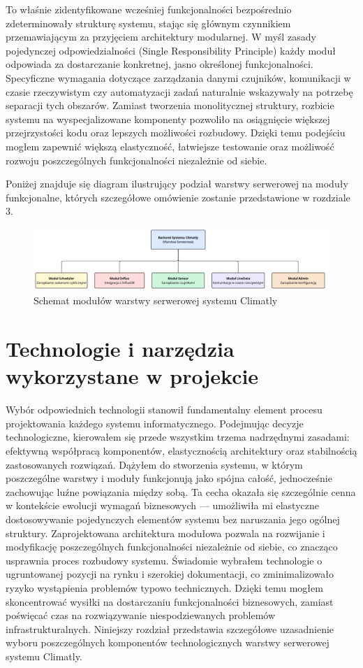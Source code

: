 \documentclass[a4paper,12pt,openany]{book}
\begin{document}
To właśnie zidentyfikowane wcześniej funkcjonalności bezpośrednio zdeterminowały strukturę systemu, stając się głównym czynnikiem przemawiającym za przyjęciem architektury modularnej. W myśl zasady pojedynczej odpowiedzialności (Single Responsibility Principle) każdy moduł odpowiada za dostarczanie konkretnej, jasno określonej funkcjonalności. Specyficzne wymagania dotyczące zarządzania danymi czujników, komunikacji w czasie rzeczywistym czy automatyzacji zadań naturalnie wskazywały na potrzebę separacji tych obszarów. Zamiast tworzenia monolitycznej struktury, rozbicie systemu na wyspecjalizowane komponenty pozwoliło na osiągnięcie większej przejrzystości kodu oraz lepszych możliwości rozbudowy. Dzięki temu podejściu mogłem zapewnić większą elastyczność, łatwiejsze testowanie oraz możliwość rozwoju poszczególnych funkcjonalności niezależnie od siebie.

Poniżej znajduje się diagram ilustrujący podział warstwy serwerowej na moduły funkcjonalne, których szczegółowe omówienie zostanie przedstawione w rozdziale 3.

\begin{figure}[H]
    \centering
    \includegraphics[width=1\textwidth]{Climatly-modules.pdf}
    \caption{Schemat modułów warstwy serwerowej systemu Climatly}
    \label{fig:moduly---systemu}
\end{figure}

\chapter{Technologie i narzędzia wykorzystane w projekcie}

Wybór odpowiednich technologii stanowił fundamentalny element procesu projektowania każdego systemu informatycznego. Podejmując decyzje technologiczne, kierowałem się przede wszystkim trzema nadrzędnymi zasadami: efektywną współpracą komponentów, elastycznością architektury oraz stabilnością zastosowanych rozwiązań.
Dążyłem do stworzenia systemu, w którym poszczególne warstwy i moduły funkcjonują jako spójna całość, jednocześnie zachowując luźne powiązania między sobą. Ta cecha okazała się szczególnie cenna w kontekście ewolucji wymagań biznesowych --- umożliwiła mi elastyczne dostosowywanie pojedynczych elementów systemu bez naruszania jego ogólnej struktury. Zaprojektowana architektura modułowa pozwala na rozwijanie i modyfikację poszczególnych funkcjonalności niezależnie od siebie, co znacząco usprawnia proces rozbudowy systemu.
Świadomie wybrałem technologie o ugruntowanej pozycji na rynku i szerokiej dokumentacji, co zminimalizowało ryzyko wystąpienia problemów typowo technicznych. Dzięki temu mogłem skoncentrować wysiłki na dostarczaniu funkcjonalności biznesowych, zamiast poświęcać czas na rozwiązywanie niespodziewanych problemów infrastrukturalnych. Niniejszy rozdział przedstawia szczegółowe uzasadnienie wyboru poszczególnych komponentów technologicznych warstwy serwerowej systemu Climatly.
\end{document}
